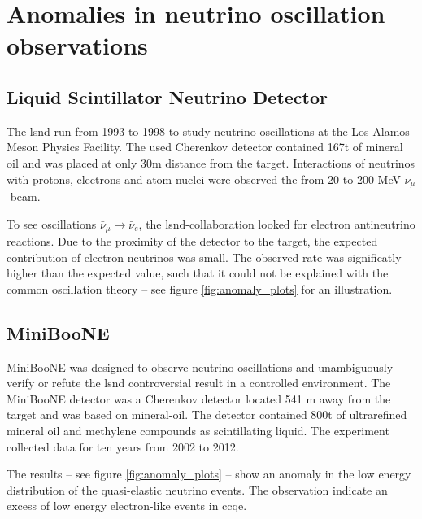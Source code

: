 
\section{Anomalies in neutrino oscillation observations}

\subsection{Liquid Scintillator Neutrino Detector}

The \gls{lsnd} run from 1993 to 1998 to study neutrino oscillations at the Los Alamos Meson Physics Facility.
The used Cherenkov detector contained 167t of mineral oil and was placed at only 30m distance from the target.
Interactions of neutrinos with protons, electrons and atom nuclei were observed the from 20 to 200 MeV $\bar{\nu}_\mu$-beam.

To see oscillations $\bar{\nu}_\mu \to \bar{\nu}_e$, the \gls{lsnd}-collaboration looked for electron antineutrino reactions.
Due to the proximity of the detector to the target, the expected contribution of electron neutrinos was small.
The observed rate was significatly higher than the expected value, such that it could not be explained with the common oscillation theory -- see figure \ref{fig:anomaly_plots} for an illustration.

\begin{figure*}
  \caption{%
    The plot on the left shows the beam excess observed by \gls{lsnd}.
    The blue region represents the required oscillation from $\bar{\nu}_\mu \to \bar{\nu}_e$.
    The plot on the right displays the excess of events at low energies observed by MiniBooNE.
  }
  \label{fig:anomaly_plots}
\end{figure*}

\subsection{MiniBooNE}

MiniBooNE was designed to observe neutrino oscillations and unambiguously verify or refute the \gls{lsnd} controversial result in a controlled environment.
The MiniBooNE detector was a Cherenkov detector located 541 m away from the target and was based on mineral-oil.\cite{Katori:2014qta}
The detector contained 800t of ultrarefined mineral oil and methylene compounds as scintillating liquid.
The experiment collected data for ten years from 2002 to 2012.

The results -- see figure \ref{fig:anomaly_plots} -- show an anomaly in the low energy distribution of the quasi-elastic neutrino events.
The observation indicate an excess of low energy electron-like events in \gls{ccqe}.\cite{Gninenko:2009ks}


